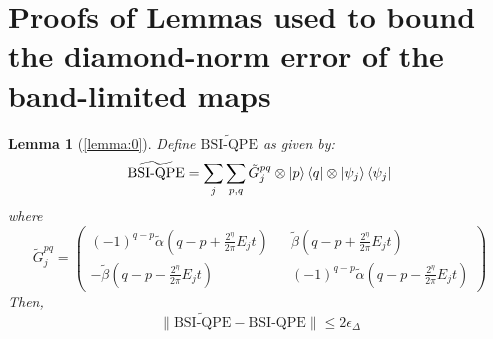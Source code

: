 \documentclass[aps,floatfix,10pt,amssymb,amsfont,amsmath,superscriptaddress,float,nofootinbib,longbibliography,nobalancelastpage,twocolumn]{revtex4-2}
\newtheorem*{lemma*}{Lemma}
\begin{document}
\section{Proofs of Lemmas used to bound the diamond-norm error of the band-limited maps}
\label{section:appendixTrunc}
\begin{lemma*}[\ref{lemma:0}]
    Define $\widetilde{\text{BSI-QPE}}$ as given by:
    \begin{equation}
       \widetilde{\text{BSI-QPE}}=\sum_j \sum_{p,q} \tilde G^{pq}_j \otimes \ket{p}\bra{q} \otimes \ket{\psi_j}\bra{\psi_j}
    \end{equation}
    where 
    \begin{equation}
        \tilde G^{pq}_j = \begin{pmatrix}
        (-1)^{q-p}\tilde\alpha(q-p+\frac{2^{\eta}}{2\pi}E_jt) && \tilde\beta(q-p+\frac{2^{\eta}}{2\pi}E_jt)\\
        -\tilde\beta (q-p-\frac{2^{\eta}}{2\pi}E_jt) && (-1)^{q-p}\tilde\alpha(q-p-\frac{2^{\eta}}{2\pi}E_jt)
    \end{pmatrix}
    \end{equation}
    Then,  
    \begin{equation}
        \|\widetilde{\text{BSI-QPE}}-\text{BSI-QPE}\| \leq 2\epsilon_{\Delta}
    \end{equation}
\end{lemma*}
\end{document}
